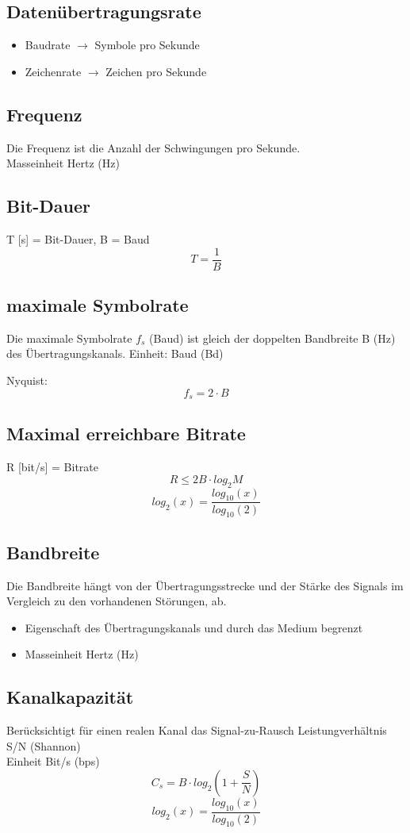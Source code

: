 \subsection{Datenübertragungsrate}{
    \begin{itemize}[noitemsep]
        \item Baudrate $\to$ Symbole pro Sekunde
        \item Zeichenrate $\to$ Zeichen pro Sekunde
    \end{itemize}
}

\subsection{Frequenz}{
    {Die Frequenz ist die Anzahl der Schwingungen pro Sekunde.\\
            Masseinheit Hertz (Hz)\\}
}

\subsection{Bit-Dauer }
{  T [s] = Bit-Dauer, B = Baud \\}
$$ T = \frac{1}{B}$$

\columnbreak
\subsection{maximale Symbolrate}
{    Die maximale Symbolrate $f_s$ (Baud) ist gleich der doppelten Bandbreite B (Hz) des
    Übertragungskanals.
}
{Einheit: Baud (Bd)}

{Nyquist:}
$$ f_s = 2 \cdot B$$

\subsection{Maximal erreichbare Bitrate}{
R [bit/s] = Bitrate \\
$$ R \leq 2B \cdot log_2{M} $$
$$ log_2(x) = \frac{log_{10}(x)}{log_{10}(2)} $$
}



\subsection{Bandbreite}{
    Die Bandbreite hängt von der Übertragungsstrecke und der Stärke des Signals im
    Vergleich zu den vorhandenen Störungen, ab.
    \begin{itemize}[noitemsep]
        \item Eigenschaft des Übertragungskanals und durch das Medium begrenzt
        \item Masseinheit Hertz (Hz)
    \end{itemize}
}

\subsection{Kanalkapazität}{
    Berücksichtigt für einen realen Kanal das Signal-zu-Rausch Leistungverhältnis S/N (Shannon)
    \\ Einheit Bit/s (bps)
    $$ C_s = B \cdot log_2(1 + \frac{S}{N})$$
    $$ log_2(x) = \frac{log_{10}(x)}{log_{10}(2)} $$
}
